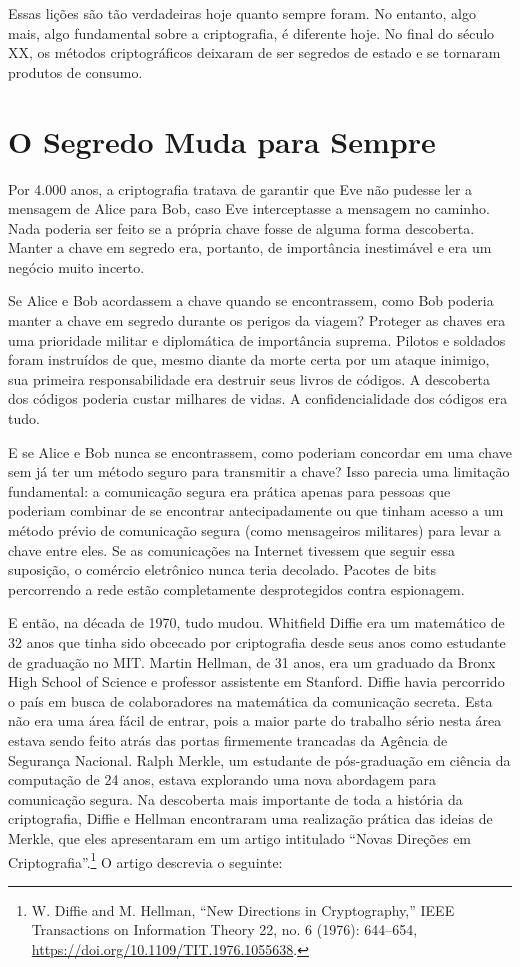 \documentclass{book}
\begin{document}
Essas lições são tão verdadeiras hoje quanto sempre foram. No entanto, algo mais, algo fundamental sobre a criptografia, é diferente hoje. No final do século XX, os métodos criptográficos deixaram de ser segredos de estado e se tornaram produtos de consumo.


\section{O Segredo Muda para Sempre}
\label{segredos:muda}

Por 4.000 anos, a criptografia tratava de garantir que Eve não pudesse ler a mensagem de Alice para Bob, caso Eve interceptasse a mensagem no caminho. Nada poderia ser feito se a própria chave fosse de alguma forma descoberta. Manter a chave em segredo era, portanto, de importância inestimável e era um negócio muito incerto.

Se Alice e Bob acordassem a chave quando se encontrassem, como Bob poderia manter a chave em segredo durante os perigos da viagem? Proteger as chaves era uma prioridade militar e diplomática de importância suprema. Pilotos e soldados foram instruídos de que, mesmo diante da morte certa por um ataque inimigo, sua primeira responsabilidade era destruir seus livros de códigos. A descoberta dos códigos poderia custar milhares de vidas. A confidencialidade dos códigos era tudo.

E se Alice e Bob nunca se encontrassem, como poderiam concordar em uma chave sem já ter um método seguro para transmitir a chave? Isso parecia uma limitação fundamental: a comunicação segura era prática apenas para pessoas que poderiam combinar de se encontrar antecipadamente ou que tinham acesso a um método prévio de comunicação segura (como mensageiros militares) para levar a chave entre eles. Se as comunicações na Internet tivessem que seguir essa suposição, o comércio eletrônico nunca teria decolado. Pacotes de bits percorrendo a rede estão completamente desprotegidos contra espionagem.

E então, na década de 1970, tudo mudou. Whitfield Diffie era um matemático de 32 anos que tinha sido obcecado por criptografia desde seus anos como estudante de graduação no MIT. Martin Hellman, de 31 anos, era um graduado da Bronx High School of Science e professor assistente em Stanford. Diffie havia percorrido o país em busca de colaboradores na matemática da comunicação secreta. Esta não era uma área fácil de entrar, pois a maior parte do trabalho sério nesta área estava sendo feito atrás das portas firmemente trancadas da Agência de Segurança Nacional. Ralph Merkle, um estudante de pós-graduação em ciência da computação de 24 anos, estava explorando uma nova abordagem para comunicação segura. Na descoberta mais importante de toda a história da criptografia, Diffie e Hellman encontraram uma realização prática das ideias de Merkle, que eles apresentaram em um artigo intitulado ``Novas Direções em Criptografia''.\footnote{W. Diffie and M. Hellman, “New Directions in Cryptography,” IEEE Transactions on Information Theory 22, no. 6 (1976): 644–654, \url{https://doi.org/10.1109/TIT.1976.1055638}.} O artigo descrevia o seguinte: 
\end{document}
